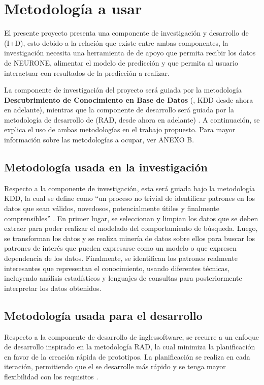 \section{Metodología a usar}
\label{sec:metodologia}
El presente proyecto presenta una componente de investigación y desarrollo de  (I+D), esto debido a la relación que existe entre ambas componentes, la investigación necesita una herramienta de  de apoyo que permita recibir los datos de NEURONE, alimentar el modelo de predicción y que permita al usuario interactuar con resultados de la predicción a realizar.

La componente de investigación del proyecto será guiada por la metodología \textbf{Descubrimiento de Conocimiento en Base de Datos} (, KDD desde ahora en adelante), mientras que la componente de desarrollo será guiada por la metodología de desarrollo de  \textbf{} (RAD, desde ahora en adelante) \parencite{martin1991rapid}. A continuación, se explica el uso de ambas metodologías en el trabajo propuesto. Para mayor información sobre las metodologías a ocupar, ver ANEXO B.

\subsection{Metodología usada en la investigación}
Respecto a la componente de investigación, esta será guiada bajo la metodología KDD, la cual se define como “un proceso no trivial de identificar patrones en los datos que sean válidos, novedosos, potencialmente útiles y finalmente comprensibles” \parencite[p.~5]{fayyad1996data}. En primer lugar, se seleccionan y limpian los datos que se deben extraer para poder realizar el modelado del comportamiento de búsqueda. Luego, se transforman los datos y se realiza minería de datos sobre ellos para buscar los patrones de interés que pueden expresarse como un modelo o que expresen dependencia de los datos. Finalmente, se identifican los patrones realmente interesantes que representan el conocimiento, usando diferentes técnicas, incluyendo análisis estadísticos y lenguajes de consultas para posteriormente interpretar los datos obtenidos.

\subsection{Metodología usada para el desarrollo}
Respecto a la componente de desarrollo de ingles{software}, se recurre a un enfoque de desarrollo inspirado en la metodología RAD, la cual minimiza la planificación en favor de la creación rápida de prototipos. La planificación se realiza en cada iteración, permitiendo que el  se desarrolle más rápido y se tenga mayor flexibilidad con los requisitos \parencite{mcconnell1996rapid}.
